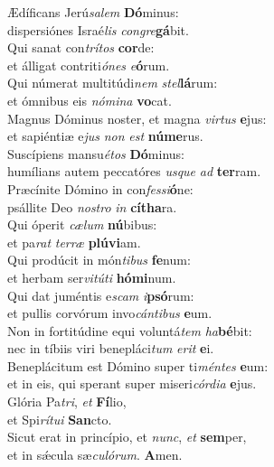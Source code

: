 \evenverse Ædíficans Jerú\textit{sa}\textit{lem} \textbf{Dó}minus:~\*\\
\evenverse dispersiónes Israé\textit{lis} \textit{con}\textit{gre}\textbf{gá}bit.\\
\oddverse Qui sanat con\textit{trí}\textit{tos} \textbf{cor}de:~\*\\
\oddverse et álligat contriti\textit{ó}\textit{nes} \textit{e}\textbf{ó}rum.\\
\evenverse Qui númerat multitúdi\textit{nem} \textit{stel}\textbf{lá}rum:~\*\\
\evenverse et ómnibus eis \textit{nó}\textit{mi}\textit{na} \textbf{vo}cat.\\
\oddverse Magnus Dóminus noster, et magna \textit{vir}\textit{tus} \textbf{e}jus:~\*\\
\oddverse et sapiéntiæ e\textit{jus} \textit{non} \textit{est} \textbf{nú}\textbf{me}rus.\\
\evenverse Suscípiens mansu\textit{é}\textit{tos} \textbf{Dó}minus:~\*\\
\evenverse humílians autem peccatóres \textit{us}\textit{que} \textit{ad} \textbf{ter}ram.\\
\oddverse Præcínite Dómino in con\textit{fes}\textit{si}\textbf{ó}ne:~\*\\
\oddverse psállite Deo \textit{no}\textit{stro} \textit{in} \textbf{cí}\textbf{tha}ra.\\
\evenverse Qui óperit \textit{cæ}\textit{lum} \textbf{nú}bibus:~\*\\
\evenverse et pa\textit{rat} \textit{ter}\textit{ræ} \textbf{plú}\textbf{vi}am.\\
\oddverse Qui prodúcit in món\textit{ti}\textit{bus} \textbf{fe}num:~\*\\
\oddverse et herbam ser\textit{vi}\textit{tú}\textit{ti} \textbf{hó}\textbf{mi}num.\\
\evenverse Qui dat juméntis e\textit{scam} \textit{i}\textbf{psó}rum:~\*\\
\evenverse et pullis corvórum invo\textit{cán}\textit{ti}\textit{bus} \textbf{e}um.\\
\oddverse Non in fortitúdine equi voluntá\textit{tem} \textit{ha}\textbf{bé}bit:~\*\\
\oddverse nec in tíbiis viri benepláci\textit{tum} \textit{e}\textit{rit} \textbf{e}i.\\
\evenverse Beneplácitum est Dómino super ti\textit{mén}\textit{tes} \textbf{e}um:~\*\\
\evenverse et in eis, qui sperant super miseri\textit{cór}\textit{di}\textit{a} \textbf{e}jus.\\
\oddverse Glória Pa\textit{tri}, \textit{et} \textbf{Fí}lio,~\*\\
\oddverse et Spi\textit{rí}\textit{tu}\textit{i} \textbf{San}cto.\\
\evenverse Sicut erat in princípio, et \textit{nunc}, \textit{et} \textbf{sem}per,~\*\\
\evenverse et in sǽcula sæ\textit{cu}\textit{ló}\textit{rum}. \textbf{A}men.\\
